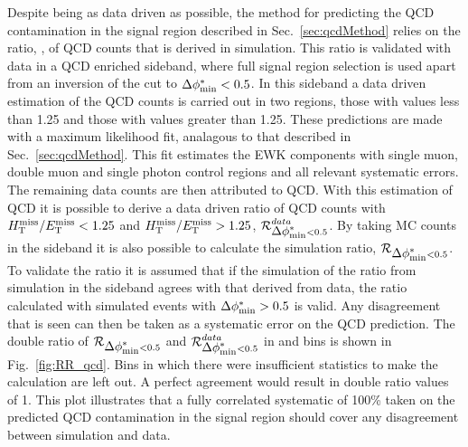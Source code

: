 Despite being as data driven as possible, the method for predicting the QCD contamination in the signal region
described in Sec.~\ref{sec:qcdMethod} relies on the ratio, \rmhtmet,
of QCD counts
that is derived in simulation. This ratio is validated with data in a
QCD enriched sideband, where full signal region selection is used apart from
an inversion of the \bdphi cut to $\mbox{$\Delta\phi^{*}_{\rm min}$}<0.5$. In this sideband a
data driven estimation of the QCD counts is carried out in two regions, those with \mhtmet values less than
1.25 and those with values greater than 1.25. These predictions are
made with a maximum likelihood
fit, analagous to that described in Sec.~\ref{sec:qcdMethod}. This fit
estimates the EWK components with single muon, double muon and single
photon control regions and all relevant systematic errors. The
remaining data counts are then attributed to QCD. With this estimation 
of QCD it is possible to derive a data driven ratio of QCD counts with
$\mbox{$\mbox{$H_{\rm T}^{\rm miss}$} / \mbox{$E_\text{T}^{\rm miss}$}$}<1.25$ and $\mbox{$\mbox{$H_{\rm T}^{\rm miss}$} / \mbox{$E_\text{T}^{\rm miss}$}$}>1.25$, $\mbox{$\mathcal{R}$}_{\mbox{$\Delta\phi^{*}_{\rm min}$}<0.5}^{data}$. By
taking MC counts in the \bdphi sideband it is also possible to
calculate the \mhtmet simulation ratio, $\mbox{$\mathcal{R}$}_{\mbox{$\Delta\phi^{*}_{\rm min}$}<0.5}$. To
validate the ratio \rmhtmet it is assumed that if the simulation of
the ratio from simulation in the \bdphi sideband agrees with that
derived from data, the ratio calculated with simulated events with
$\mbox{$\Delta\phi^{*}_{\rm min}$}>0.5$ is valid. Any disagreement that is seen can then be taken
as a systematic error on the QCD prediction. The double ratio of
$\mbox{$\mathcal{R}$}_{\mbox{$\Delta\phi^{*}_{\rm min}$}<0.5}$ and $\mbox{$\mathcal{R}$}_{\mbox{$\Delta\phi^{*}_{\rm min}$}<0.5}^{data}$ in \scalht
and \njet bins is shown in Fig.~\ref{fig:RR_qcd}. Bins in which there
were insufficient statistics to make the calculation are left out.
A perfect agreement would result in double ratio values of 1. This
plot illustrates that a fully correlated systematic of 100\% taken on the
predicted QCD contamination in the signal region should cover any
disagreement between simulation and data.

